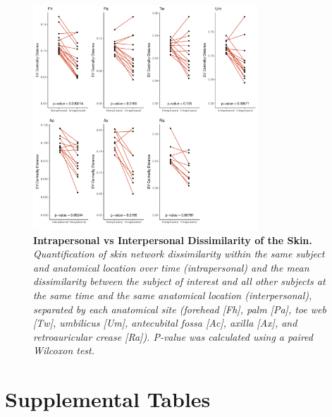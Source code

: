 \documentclass[12pt,]{article}
\begin{document}
\newpage

\begin{figure}[htbp]
\centering
\includegraphics[width=0.75000\textwidth]{../figures/intraallskin.pdf}
\caption{\textbf{Intrapersonal vs Interpersonal Dissimilarity of the
Skin.} \emph{Quantification of skin network dissimilarity within the
same subject and anatomical location over time (intrapersonal) and the
mean dissimilarity between the subject of interest and all other
subjects at the same time and the same anatomical location
(interpersonal), separated by each anatomical site (forehead {[}Fh{]},
palm {[}Pa{]}, toe web {[}Tw{]}, umbilicus {[}Um{]}, antecubital fossa
{[}Ac{]}, axilla {[}Ax{]}, and retroauricular crease {[}Ra{]}). P-value
was calculated using a paired Wilcoxon test.}\label{allskin}}
\end{figure}

\newpage

\section{Supplemental Tables}\label{supplemental-tables}
\end{document}
